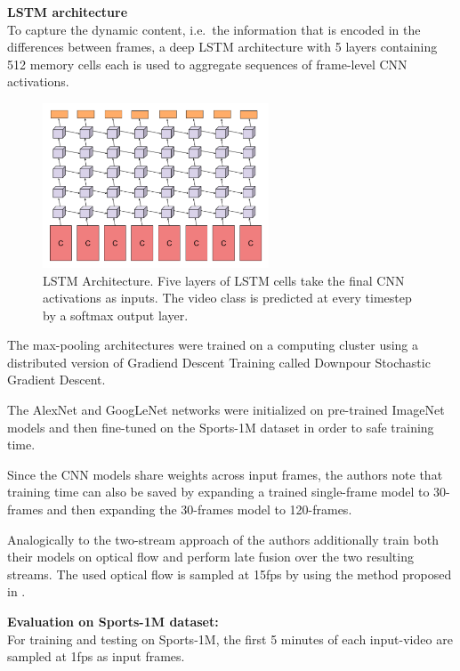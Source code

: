 \textbf{LSTM architecture}\\
To capture the dynamic content, i.e.\ the information that is encoded in the differences between frames, a deep LSTM \cite{hochreiter_long_1997} architecture with 5 layers containing 512 memory cells each is used to aggregate sequences of frame-level CNN activations.

\begin{figure}[H]
    \centering
    \includegraphics[width=0.6\textwidth]{img_deep/beyondshort_lstmarchitecture}
    \caption{LSTM Architecture. Five layers of LSTM cells take the final CNN activations as inputs. The video class is predicted at every timestep by a softmax output layer. \cite{ng_beyond_2015}}
    \label{fig:beyondshort_lstmarchitecture}
\end{figure}

The max-pooling architectures were trained on a computing cluster using a distributed version of Gradiend Descent Training called Downpour Stochastic Gradient Descent.

The AlexNet and GoogLeNet networks were initialized on pre-trained ImageNet models and then fine-tuned on the Sports-1M dataset in order to safe training time.

Since the CNN models share weights across input frames, the authors note that training time can also be saved by expanding a trained single-frame model to 30-frames and then expanding the 30-frames model to 120-frames.

Analogically to the two-stream approach of \cite{simonyan_two-stream_2014} the authors additionally train both their models on optical flow and perform late fusion over the two resulting streams.
The used optical flow is sampled at 15fps by using the method proposed in \cite{zach_duality_2007a}.

\textbf{Evaluation on Sports-1M dataset:}\\
For training and testing on Sports-1M, the first 5 minutes of each input-video are sampled at 1fps as input frames.

